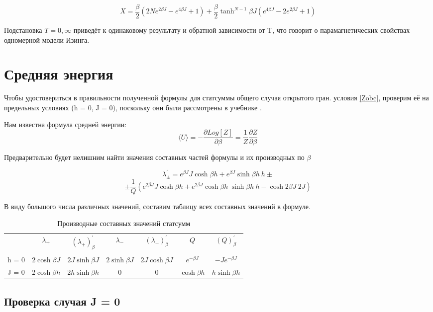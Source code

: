 \documentclass{article}
\newcommand{\bj}{\beta J}
\newcommand{\dbj}{2 \bj}
\newcommand{\bh}{\beta h}
\newcommand{\lp}{\lambda_{+}}
\newcommand{\lm}{\lambda_{-}}
\newcommand{\dzdb}{\frac{\partial Z}{\partial \beta}}
\newcommand{\la}{\langle}
\newcommand{\ra}{\rangle}
\numberwithin{equation}{section}
\begin{document}
\[ X = \frac{\beta}{2} (2Ne^{2\bj} - e^{4\bj} + 1) + \frac{\beta}{2} \tanh^{N-1}\bj (e^{4\bj} - 2 e^{2\bj} + 1)\]

Подстановка $ T = 0, \infty$ приведёт к одинаковому результату и обратной зависимости от T, что говорит о парамагнетических свойствах одномерной модели Изинга.

\section{Средняя энергия}

Чтобы удостовериться в правильности полученной формулы для статсуммы общего случая открытого гран. условия \eqref{Zobc}, проверим её на предельных условиях (h = 0, J = 0), поскольку они были рассмотрены в учебнике \cite{Swen}.

Нам известна формула средней энергии:
\begin{equation}\label{MeanE}
    \la U \ra = -\frac{\partial Log[Z]}{\partial \beta} = \frac{1}{Z} \dzdb
\end{equation}

Предварительно будет нелишним найти значения составных частей формулы и их производных по $\beta$

\[ \lambda_{\pm}^{'} = e^{\bj}J\cosh{\bh} + e^{\bj}\sinh{\bh}\ h \pm \]
\[\pm \frac{1}{Q}  (e^{\dbj}J\cosh{\bh} + e^{\dbj}\cosh{\bh}\ \sinh{\bh}\ h - \cosh{\dbj}\ 2J) \] 

В виду большого числа различных значений, составим таблицу всех составных значений в формуле.
\begin{table}[h!]\label{derLTab}
    \centering
    \begin{tabular}{c c c c c c c}
         & $\lp$ & $(\lp)^{'}_{\beta}$ & $\lm$ & $(\lm)^{'}_{\beta}$ & $Q$ & $(Q)^{'}_{\beta}$  \\ \\
        h = 0 & $2\cosh{\bj}$ & $2J\sinh{\bj}$ & $2\sinh{\bj}$ & $2J\cosh{\bj}$ & $e^{-\bj}$ & $-J e^{-\bj}$ \\
        J = 0 & $2\cosh{\bh}$ & $2h\sinh{\bh}$ & $0$ & $0$ & $\cosh{\bh}$ & $h\sinh{\bh}$\\
    \end{tabular}
    \caption{Производные составных значений статсумм}
\end{table}



\subsection{Проверка случая J = 0}
\end{document}
